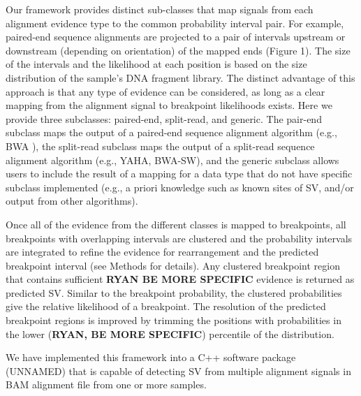 \documentclass[11pt]{article}
\begin{document}

Our framework provides distinct sub-classes that map signals from each alignment 
evidence type to the common probability interval pair.  For example, paired-end 
sequence alignments are projected to a pair of intervals upstream or downstream 
(depending on orientation) of the mapped ends (Figure 1).  The size of the 
intervals and the likelihood at each position is based on the size distribution
of the sample's DNA fragment library.  The distinct advantage of this approach
is that any type of evidence can be considered, as long as a clear mapping from 
the alignment signal to breakpoint likelihoods exists.
Here we provide three subclasses: paired-end, split-read, and generic.  The
pair-end subclass maps the output of a paired-end sequence alignment algorithm
(e.g., BWA \cite{Li2009}), the split-read subclass maps the output of a split-read sequence
alignment algorithm (e.g., YAHA\cite{Faust2012}, BWA-SW\cite{Li2010}), and the 
generic subclass allows users to include the result of a mapping for a data 
type that do not have specific subclass implemented (e.g., a priori knowledge 
such as known sites of SV, and/or output from other algorithms).

Once all of the evidence from the different classes is mapped to breakpoints,
all breakpoints with overlapping intervals are clustered and the probability
intervals are integrated to refine the evidence for rearrangement and the 
predicted breakpoint interval (see Methods for details).  Any clustered 
breakpoint region that contains sufficient \textbf{RYAN BE MORE SPECIFIC} 
evidence is returned as predicted SV.  
Similar to the breakpoint probability, the clustered probabilities give the 
relative likelihood of a breakpoint.  The resolution of the predicted breakpoint
regions is improved by trimming the positions with probabilities 
in the lower (\textbf{RYAN, BE MORE SPECIFIC}) percentile of the distribution.

We have implemented this framework into a C++ software package (UNNAMED) that is
capable of detecting SV from multiple alignment signals in BAM alignment file
from one or more samples.
\end{document}
